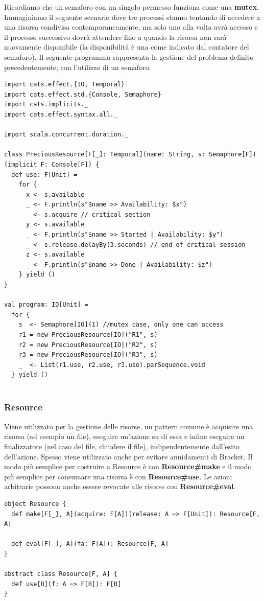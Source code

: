 \noindent Ricordiamo che un semaforo con un singolo permesso funziona
come una \textbf{mutex}. Immaginiamo il seguente scenario dove tre processi stanno tentando di accedere a una risorsa condivisa contemporaneamente, ma solo uno alla volta avrà accesso e il processo successivo dovrà attendere fino a quando la risorsa non sarà nuovamente disponibile (la disponibilità è una come indicato dal contatore del semaforo). Il seguente programma rappresenta la gestione del problema definito precedentemente, con l'utilizzo di un semaforo.

\begin{verbatim}
import cats.effect.{IO, Temporal}
import cats.effect.std.{Console, Semaphore}
import cats.implicits._
import cats.effect.syntax.all._

import scala.concurrent.duration._

class PreciousResource[F[_]: Temporal](name: String, s: Semaphore[F])
(implicit F: Console[F]) {
  def use: F[Unit] =
    for {
      x <- s.available
      _ <- F.println(s"$name >> Availability: $x")
      _ <- s.acquire // critical section
      y <- s.available
      _ <- F.println(s"$name >> Started | Availability: $y")
      _ <- s.release.delayBy(3.seconds) // end of critical session
      z <- s.available
      _ <- F.println(s"$name >> Done | Availability: $z")
    } yield ()
}

val program: IO[Unit] =
  for {
    s  <- Semaphore[IO](1) //mutex case, only one can access
    r1 = new PreciousResource[IO]("R1", s)
    r2 = new PreciousResource[IO]("R2", s)
    r3 = new PreciousResource[IO]("R3", s)
    _  <- List(r1.use, r2.use, r3.use).parSequence.void
  } yield ()
    
\end{verbatim}

\subsubsection{Resource}
Viene utilizzato per la gestione delle risorse, un pattern comune è acquisire una risorsa
(ad esempio un file), eseguire un’azione su di essa e infine eseguire un finalizzatore (nel
caso del file, chiudere il file), indipendentemente dall’esito dell’azione. Spesso viene utilizzato anche per evitare annidamenti di Bracket. Il modo più semplice per costruire a Resource è con \textbf{Resource\#make} e il modo più semplice per consumare una risorsa è con \textbf{Resource\#use}. Le azioni arbitrarie possono anche essere revocate alle risorse con \textbf{Resource\#eval}.
\begin{verbatim}
object Resource {
  def make[F[_], A](acquire: F[A])(release: A => F[Unit]): Resource[F, A]

  def eval[F[_], A](fa: F[A]): Resource[F, A]
}

abstract class Resource[F, A] {
  def use[B](f: A => F[B]): F[B]
}
\end{verbatim}

